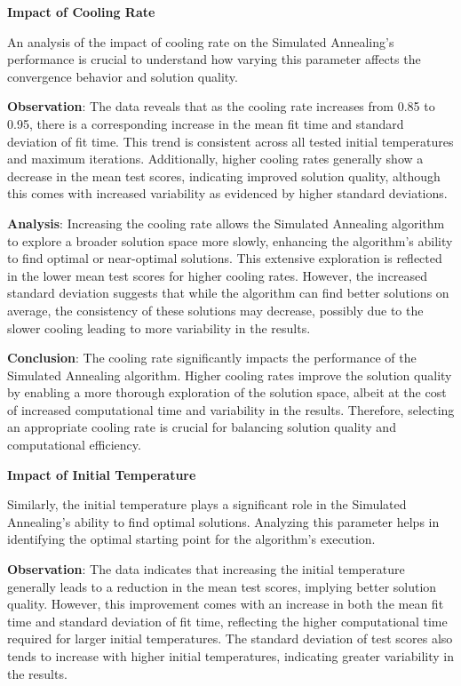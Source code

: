 \documentclass{article}
\begin{document}
    \textbf{Impact of Cooling Rate}

    An analysis of the impact of cooling rate on the Simulated Annealing’s performance is crucial to understand how varying this parameter affects the convergence behavior and solution quality.

    \textbf{Observation}: The data reveals that as the cooling rate increases from 0.85 to 0.95, there is a corresponding increase in the mean fit time and standard deviation of fit time. This trend is consistent across all tested initial temperatures and maximum iterations. Additionally, higher cooling rates generally show a decrease in the mean test scores, indicating improved solution quality, although this comes with increased variability as evidenced by higher standard deviations.

    \textbf{Analysis}: Increasing the cooling rate allows the Simulated Annealing algorithm to explore a broader solution space more slowly, enhancing the algorithm's ability to find optimal or near-optimal solutions. This extensive exploration is reflected in the lower mean test scores for higher cooling rates. However, the increased standard deviation suggests that while the algorithm can find better solutions on average, the consistency of these solutions may decrease, possibly due to the slower cooling leading to more variability in the results.

    \textbf{Conclusion}: The cooling rate significantly impacts the performance of the Simulated Annealing algorithm. Higher cooling rates improve the solution quality by enabling a more thorough exploration of the solution space, albeit at the cost of increased computational time and variability in the results. Therefore, selecting an appropriate cooling rate is crucial for balancing solution quality and computational efficiency.

    \textbf{Impact of Initial Temperature}

    Similarly, the initial temperature plays a significant role in the Simulated Annealing’s ability to find optimal solutions. Analyzing this parameter helps in identifying the optimal starting point for the algorithm’s execution.

    \textbf{Observation}: The data indicates that increasing the initial temperature generally leads to a reduction in the mean test scores, implying better solution quality. However, this improvement comes with an increase in both the mean fit time and standard deviation of fit time, reflecting the higher computational time required for larger initial temperatures. The standard deviation of test scores also tends to increase with higher initial temperatures, indicating greater variability in the results.
\end{document}
